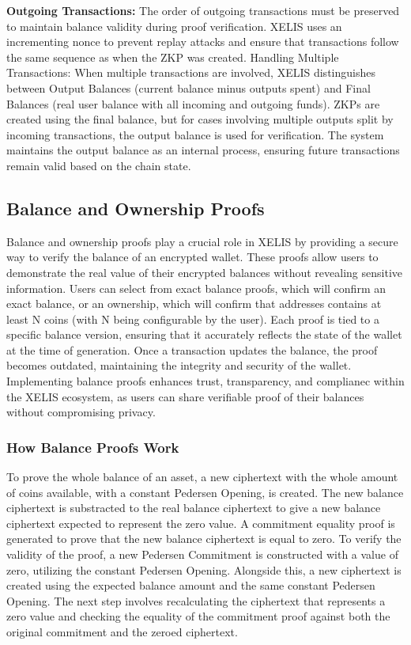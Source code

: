 \documentclass[10pt,a4paper,twocolumn]{article}
\begin{document}
\textbf{Outgoing Transactions:} The order of outgoing transactions must be preserved to maintain balance validity during proof verification. XELIS uses an incrementing nonce to prevent replay attacks and ensure that transactions follow the same sequence as when the ZKP was created.
Handling Multiple Transactions: When multiple transactions are involved, XELIS distinguishes between Output Balances (current balance minus outputs spent) and Final Balances (real user balance with all incoming and outgoing funds). ZKPs are created using the final balance, but for cases involving multiple outputs split by incoming transactions, the output balance is used for verification. The system maintains the output balance as an internal process, ensuring future transactions remain valid based on the chain state.\\

\subsection{Balance and Ownership Proofs}

Balance and ownership proofs play a crucial role in XELIS by providing a secure way to verify the balance of an encrypted wallet. These proofs allow users to demonstrate the real value of their encrypted balances without revealing sensitive information. Users can select from exact balance proofs, which will confirm an exact balance, or an ownership, which will confirm that addresses contains at least N coins (with N being configurable by the user).  Each proof is tied to a specific balance version, ensuring that it accurately reflects the state of the wallet at the time of generation. Once a transaction updates the balance, the proof becomes outdated, maintaining the integrity and security of the wallet.\\

Implementing balance proofs enhances trust, transparency, and complianec within the XELIS ecosystem, as users can share verifiable proof of their balances without compromising privacy.

\subsubsection{How Balance Proofs Work}

To prove the whole balance of an asset, a new ciphertext with the whole amount of coins available, with a constant Pedersen Opening, is created. The new balance ciphertext is substracted to the real balance ciphertext to give a new balance ciphertext expected to represent the zero value. A commitment equality proof is generated to prove that the new balance ciphertext is equal to zero. To verify the validity of the proof, a new Pedersen Commitment is constructed with a value of zero, utilizing the constant Pedersen Opening. Alongside this, a new ciphertext is created using the expected balance amount and the same constant Pedersen Opening. The next step involves recalculating the ciphertext that represents a zero value and checking the equality of the commitment proof against both the original commitment and the zeroed ciphertext.\\
\end{document}

